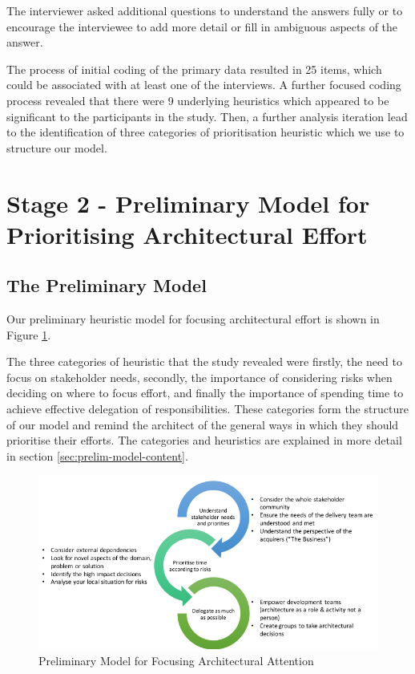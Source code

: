 The interviewer asked additional questions to understand the answers fully or to encourage the interviewee to add more detail or fill in ambiguous aspects of the answer.

The process of initial coding of the primary data resulted in 25 items, which could be associated with at least one of the interviews.  A further focused coding process revealed that there were 9 underlying heuristics which appeared to be significant to the participants in the study. Then, a further analysis iteration lead to the identification of three categories of prioritisation heuristic which we use to structure our model.

\section{Stage 2 - Preliminary Model for Prioritising Architectural Effort}
\subsection{The Preliminary Model}

Our preliminary heuristic model for focusing architectural effort is shown in Figure \ref{figure:prelmodel}.
 
The three categories of heuristic that the study revealed were firstly, the need to focus on stakeholder needs, secondly, the importance of considering risks when deciding on where to focus effort, and finally the importance of spending time to achieve effective delegation of responsibilities.  These categories form the structure of our model and remind the architect of the general ways in which they should prioritise their efforts. The categories and heuristics are explained in more detail in section \ref{sec:prelim-model-content}.

\begin{figure}
\centering
\includegraphics[width=\textwidth]{Figures/prioritisation-prelim-model}
\caption{Preliminary Model for Focusing Architectural Attention}
\label{figure:prelmodel}
\end{figure}  

